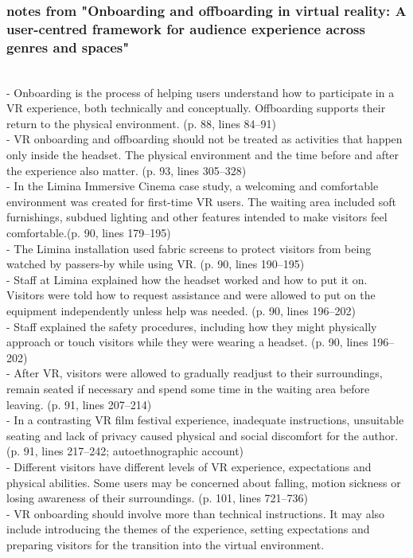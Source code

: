 \documentclass{article}
\begin{document}
\subsubsection{notes from "Onboarding and offboarding in virtual reality: A user-centred framework for audience experience across genres and spaces"}
\\
- Onboarding is the process of helping users understand how to participate in a VR experience, both technically and conceptually. Offboarding supports their return to the physical environment.
(p. 88, lines 84–91)
\\
- VR onboarding and offboarding should not be treated as activities that happen only inside the headset. The physical environment and the time before and after the experience also matter.
(p. 93, lines 305–328)
\\
- In the Limina Immersive Cinema case study, a welcoming and comfortable environment was created for first-time VR users. The waiting area included soft furnishings, subdued lighting and other features intended to make visitors feel comfortable.(p. 90, lines 179–195)
\\
- The Limina installation used fabric screens to protect visitors from being watched by passers-by while using VR.
(p. 90, lines 190–195)
\\
- Staff at Limina explained how the headset worked and how to put it on. Visitors were told how to request assistance and were allowed to put on the equipment independently unless help was needed.
(p. 90, lines 196–202)
\\
- Staff explained the safety procedures, including how they might physically approach or touch visitors while they were wearing a headset.
(p. 90, lines 196–202)
\\
- After VR, visitors were allowed to gradually readjust to their surroundings, remain seated if necessary and spend some time in the waiting area before leaving.
(p. 91, lines 207–214)
\\
- In a contrasting VR film festival experience, inadequate instructions, unsuitable seating and lack of privacy caused physical and social discomfort for the author.
(p. 91, lines 217–242; autoethnographic account)
\\
- Different visitors have different levels of VR experience, expectations and physical abilities. Some users may be concerned about falling, motion sickness or losing awareness of their surroundings.
(p. 101, lines 721–736)
\\
- VR onboarding should involve more than technical instructions. It may also include introducing the themes of the experience, setting expectations and preparing visitors for the transition into the virtual environment.
\end{document}
